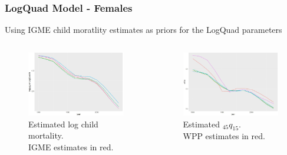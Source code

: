 \documentclass[hyperref={colorlinks, citecolor=blue}]{beamer}
\begin{document}
\begin{frame}
\frametitle{LogQuad Model - Females}
Using IGME child moratlity estimates as priors for the LogQuad parameters
\begin{columns}
\begin{figure}
\includegraphics[width=\linewidth]{Graphs/female h.jpg}
\caption{Estimated log child mortality. \\IGME estimates in red.}
\end{figure}
\begin{figure}
\includegraphics[width=\linewidth]{Graphs/female q4515.jpg}
\caption{Estimated $_{45}q_{15}$. \\WPP estimates in red.}
\end{figure}
\end{columns}
\end{frame}
\end{document}
